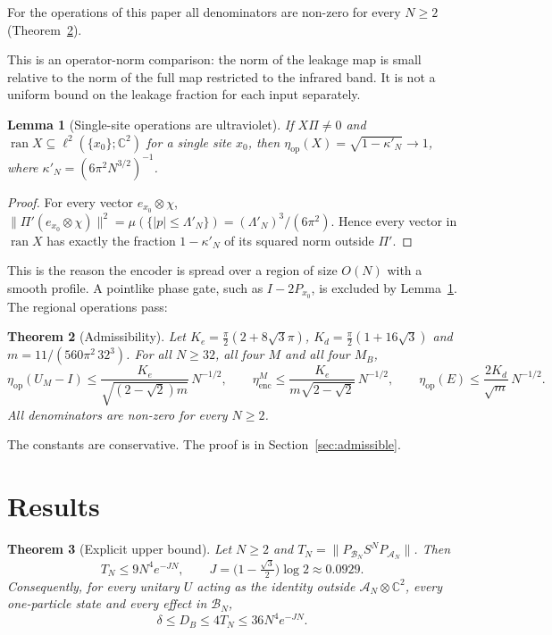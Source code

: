 \documentclass[11pt]{amsart}
\newtheorem{theorem}{Theorem}[section]
\newtheorem{lemma}[theorem]{Lemma}
\theoremstyle{definition}
\theoremstyle{remark}
\newcommand{\C}{\mathbb{C}}
\newcommand{\cA}{\mathcal{A}}
\newcommand{\cB}{\mathcal{B}}
\begin{document}
For the operations of this paper all denominators are non-zero for every
$N\ge2$ (Theorem~\ref{thm:admissible}).

This is an operator-norm comparison: the norm of the leakage map is small
relative to the norm of the full map restricted to the infrared band.
It is not a uniform bound on the leakage fraction for each input separately.

\begin{lemma}[Single-site operations are ultraviolet]\label{lem:point}
If $X\Pi\ne0$ and $\operatorname{ran}X\subseteq\ell^2(\{x_0\};\C^2)$ for a
single site $x_0$, then
$\eta_{\mathrm{op}}(X)=\sqrt{1-\kappa'_N}\to1$, where
$\kappa'_N=(6\pi^2N^{3/2})^{-1}$.
\end{lemma}

\begin{proof}
For every vector $e_{x_0}\otimes\chi$,
$\|\Pi'(e_{x_0}\otimes\chi)\|^2=\mu(\{|p|\le\Lambda'_N\})=(\Lambda'_N)^3/(6\pi^2)$.
Hence every vector in $\operatorname{ran}X$ has exactly the fraction
$1-\kappa'_N$ of its squared norm outside $\Pi'$.
\end{proof}

This is the reason the encoder is spread over a region of size $O(N)$ with
a smooth profile.  A pointlike phase gate, such as $I-2P_{x_0}$, is
excluded by Lemma~\ref{lem:point}.  The regional operations pass:

\begin{theorem}[Admissibility]\label{thm:admissible}
Let $K_e=\frac\pi2(2+8\sqrt3\pi)$, $K_d=\frac\pi2(1+16\sqrt3)$ and
$m=11/(560\pi^2\,32^3)$.  For all $N\ge32$, all four $M$ and all four
$M_B$,
\[
\eta_{\mathrm{op}}(U_M-I)\le\frac{K_e}{\sqrt{(2-\sqrt2)m}}\,N^{-1/2},\qquad
\eta_{\mathrm{enc}}^M\le\frac{K_e}{m\sqrt{2-\sqrt2}}\,N^{-1/2},\qquad
\eta_{\mathrm{op}}(E)\le\frac{2K_d}{\sqrt m}\,N^{-1/2}.
\]
All denominators are non-zero for every $N\ge2$.
\end{theorem}

The constants are conservative.  The proof is in Section~\ref{sec:admissible}.

\section{Results}\label{sec:results}

\begin{theorem}[Explicit upper bound]\label{thm:upper}
Let $N\ge2$ and $T_N=\|P_{\cB_N}S^NP_{\cA_N}\|$.  Then
\[
T_N\le9N^4e^{-JN},\qquad J=\bigl(1-\tfrac{\sqrt3}2\bigr)\log2\approx0.0929 .
\]
Consequently, for every unitary $U$ acting as the identity outside
$\cA_N\otimes\C^2$, every one-particle state and every effect in $\cB_N$,
\[
\delta\le D_B\le4T_N\le36N^4e^{-JN}.
\]
\end{theorem}
\end{document}
